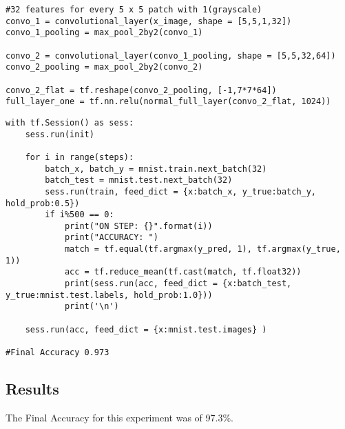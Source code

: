 \begin{lstlisting}
#32 features for every 5 x 5 patch with 1(grayscale)
convo_1 = convolutional_layer(x_image, shape = [5,5,1,32])
convo_1_pooling = max_pool_2by2(convo_1)

convo_2 = convolutional_layer(convo_1_pooling, shape = [5,5,32,64])
convo_2_pooling = max_pool_2by2(convo_2)

convo_2_flat = tf.reshape(convo_2_pooling, [-1,7*7*64])
full_layer_one = tf.nn.relu(normal_full_layer(convo_2_flat, 1024))
\end{lstlisting}

\begin{lstlisting}
with tf.Session() as sess:
    sess.run(init)
    
    for i in range(steps):
        batch_x, batch_y = mnist.train.next_batch(32)
        batch_test = mnist.test.next_batch(32)
        sess.run(train, feed_dict = {x:batch_x, y_true:batch_y, hold_prob:0.5})
        if i%500 == 0:
            print("ON STEP: {}".format(i))
            print("ACCURACY: ")
            match = tf.equal(tf.argmax(y_pred, 1), tf.argmax(y_true, 1))
            acc = tf.reduce_mean(tf.cast(match, tf.float32))
            print(sess.run(acc, feed_dict = {x:batch_test, y_true:mnist.test.labels, hold_prob:1.0}))
            print('\n')
            
    sess.run(acc, feed_dict = {x:mnist.test.images} )

#Final Accuracy 0.973
\end{lstlisting}

\subsection*{Results}
The Final Accuracy for this experiment was of 97.3\%.
